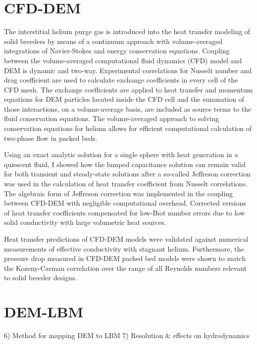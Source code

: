 \section{CFD-DEM}
The interstitial helium purge gas is introduced into the heat transfer modeling of solid breeders by means of a continuum approach with volume-averaged integrations of Navier-Stokes and energy conservation equations. Coupling between the volume-averaged computational fluid dynamics (CFD) model and DEM is dynamic and two-way. Experimental correlations for Nusselt number and drag coefficient are used to calculate exchange coefficients in every cell of the CFD mesh. The exchange coefficients are applied to heat transfer and momentum equations for DEM particles located inside the CFD cell and the summation of those interactions, on a volume-average basis, are included as source terms to the fluid conservation equations. The volume-averaged approach to solving conservation equations for helium allows for efficient computational calculation of two-phase flow in packed beds. 

Using an exact analytic solution for a single sphere with heat generation in a quiescent fluid, I showed how the lumped capacitance solution can remain valid for both transient and steady-state solutions after a so-called Jeffreson correction was used in the calculation of heat transfer coefficient from Nusselt correlations. The algebraic form of Jeffreson correction was implemented in the coupling between CFD-DEM with negligible computational overhead. Corrected versions of heat transfer coefficients compensated for low-Biot number errors due to low solid conductivity with large volumetric heat sources.

Heat transfer predictions of CFD-DEM models were validated against numerical measurements of effective conductivity with stagnant helium. Furthermore, the pressure drop measured in CFD-DEM packed bed models were shown to match the Kozeny-Carman correlation over the range of all Reynolds numbers relevant to solid breeder designs. 

\section{DEM-LBM}
6) Method for mapping DEM to LBM
7) Resolution \& effects on hydrodynamics

